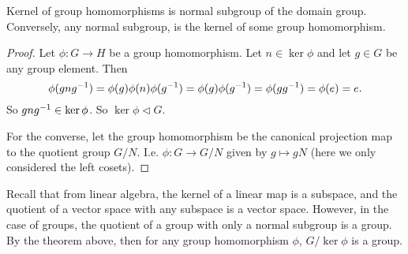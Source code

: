 \begin{theorem}
	Kernel of group homomorphisms is normal subgroup of the domain group. Conversely, any normal subgroup, is the kernel of some group homomorphism.
\end{theorem}
\begin{proof}
	Let $ \phi: G\to H $ be a group homomorphism. Let $ n \in \ker \phi $ and let $ g\in G $ be any group element. Then
	\[ \phi(gng^{-1}) = \phi(g) \phi(n) \phi(g^{-1}) = \phi(g) \phi(g^{-1}) = \phi(gg^{-1}) = \phi(e) = e. \]
	So $ gng^{-1} \in \ker \phi $. So $ \ker \phi \lhd G $.
	
	For the converse, let the group homomorphism be the canonical projection map to the quotient group $ G/N $. I.e. $ \phi: G\to G/N $ given by $ g \mapsto gN $ (here we only considered the left cosets).
\end{proof}
\begin{remark}
	Recall that from linear algebra, the kernel of a linear map is a subspace, and the quotient of a vector space with any subspace is a vector space. However, in the case of groups, the quotient of a group with only a normal subgroup is a group. By the theorem above, then for any group homomorphism $ \phi $, $ G/\ker \phi $ is a group.
\end{remark}


